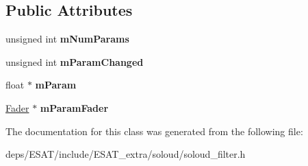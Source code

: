 \subsection*{Public Attributes}
\begin{DoxyCompactItemize}
\item 
\mbox{\label{class_so_loud_1_1_filter_instance_a3543039db3c00cd19b7d01b82c29d824}} 
unsigned int {\bfseries m\+Num\+Params}
\item 
\mbox{\label{class_so_loud_1_1_filter_instance_a4ed9e55584ed2ae59e3de878dfa8c506}} 
unsigned int {\bfseries m\+Param\+Changed}
\item 
\mbox{\label{class_so_loud_1_1_filter_instance_ab60599cfa1fcdf09e1a5753399e04048}} 
float $\ast$ {\bfseries m\+Param}
\item 
\mbox{\label{class_so_loud_1_1_filter_instance_ab30e49b98d87f106fc1202793120cac7}} 
\mbox{\hyperlink{class_so_loud_1_1_fader}{Fader}} $\ast$ {\bfseries m\+Param\+Fader}
\end{DoxyCompactItemize}


The documentation for this class was generated from the following file\+:\begin{DoxyCompactItemize}
\item 
deps/\+E\+S\+A\+T/include/\+E\+S\+A\+T\+\_\+extra/soloud/soloud\+\_\+filter.\+h\end{DoxyCompactItemize}
